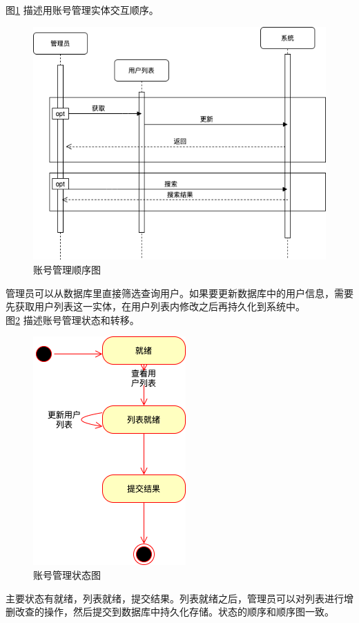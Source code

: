 \documentclass[a4paper]{ctexart}
\begin{document}
图\ref{fig:账号管理顺序图} 描述用账号管理实体交互顺序。
\begin{figure}[H]
\centering
\includegraphics[scale=0.5]{image/5_2顺序图.png}
\caption{账号管理顺序图}
\label{fig:账号管理顺序图}
\end{figure}
管理员可以从数据库里直接筛选查询用户。如果要更新数据库中的用户信息，需要先获取用户列表这一实体，在用户列表内修改之后再持久化到系统中。\\

图\ref{fig:账号管理状态图} 描述账号管理状态和转移。
\begin{figure}[H]
\centering
\includegraphics[scale=0.5]{image/5_3状态图.png}
\caption{账号管理状态图}
\label{fig:账号管理状态图}
\end{figure}
主要状态有就绪，列表就绪，提交结果。列表就绪之后，管理员可以对列表进行增删改查的操作，然后提交到数据库中持久化存储。状态的顺序和顺序图一致。\\
\end{document}
